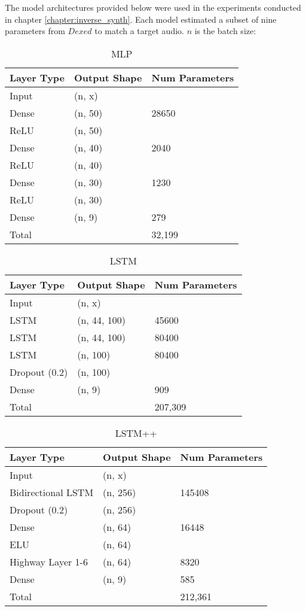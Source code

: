 \label{appendix:spiegelib_models}

The model architectures provided below were used in the experiments conducted in chapter \ref{chapter:inverse_synth}. Each model estimated a subset of nine parameters from $Dexed$ to match a target audio. $n$ is the batch size:

\begin{table}[ht]
\caption{MLP}
\centering
\begin{tabular}{l|l|l}
Layer Type & Output Shape & Num Parameters \\ \hline
Input & (n, x) & \\
Dense & (n, 50) & 28650\\
ReLU    & (n, 50) &\\
Dense & (n, 40) & 2040\\
ReLU    & (n, 40) &  \\
Dense & (n, 30) & 1230 \\
ReLU    & (n, 30) & \\
Dense   & (n, 9) & 279\\
\hline
\hline
Total   & \ & 32,199\\
\end{tabular}
\end{table}

\begin{table}[ht]
\caption{LSTM}
\centering
\begin{tabular}{l|l|l}
Layer Type & Output Shape & Num Parameters \\ \hline
Input & (n, x) & \\
LSTM & (n, 44, 100) & 45600\\
LSTM & (n, 44, 100) & 80400\\
LSTM & (n, 100) & 80400\\
Dropout (0.2) & (n, 100) & \\
Dense   & (n, 9) & 909\\
\hline
\hline
Total   & \ & 207,309\\
\end{tabular}
\end{table}

\begin{table}[ht]
\caption{LSTM++}
\centering
\begin{tabular}{l|l|l}
Layer Type & Output Shape & Num Parameters \\ \hline
Input & (n, x) & \\
Bidirectional LSTM & (n, 256) & 145408\\
Dropout (0.2) & (n, 256) & \\
Dense & (n, 64) & 16448\\
ELU & (n, 64) &\\
Highway Layer 1-6 & (n, 64) & 8320\\
Dense   & (n, 9) & 585\\
\hline
\hline
Total   & \ & 212,361\\
\end{tabular}
\end{table}


